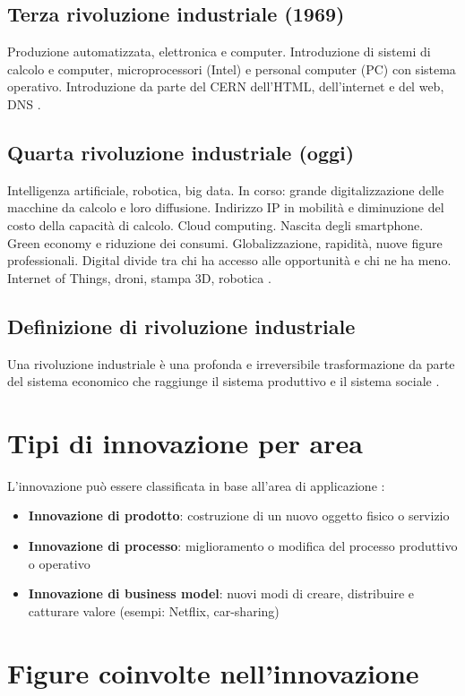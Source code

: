 \documentclass[12pt,a4paper]{article}
\begin{document}
\subsection{Terza rivoluzione industriale (1969)}
Produzione automatizzata, elettronica e computer. Introduzione di sistemi di calcolo e computer, microprocessori (Intel) e personal computer (PC) con sistema operativo. Introduzione da parte del CERN dell'HTML, dell'internet e del web, DNS .

\subsection{Quarta rivoluzione industriale (oggi)}
Intelligenza artificiale, robotica, big data. In corso: grande digitalizzazione delle macchine da calcolo e loro diffusione. Indirizzo IP in mobilità e diminuzione del costo della capacità di calcolo. Cloud computing. Nascita degli smartphone. Green economy e riduzione dei consumi. Globalizzazione, rapidità, nuove figure professionali. Digital divide tra chi ha accesso alle opportunità e chi ne ha meno. Internet of Things, droni, stampa 3D, robotica .

\subsection{Definizione di rivoluzione industriale}
Una rivoluzione industriale è una profonda e irreversibile trasformazione da parte del sistema economico che raggiunge il sistema produttivo e il sistema sociale .

\section{Tipi di innovazione per area}

L'innovazione può essere classificata in base all'area di applicazione :

\begin{itemize}
    \item \textbf{Innovazione di prodotto}: costruzione di un nuovo oggetto fisico o servizio
    \item \textbf{Innovazione di processo}: miglioramento o modifica del processo produttivo o operativo
    \item \textbf{Innovazione di business model}: nuovi modi di creare, distribuire e catturare valore (esempi: Netflix, car-sharing)
\end{itemize}

\section{Figure coinvolte nell'innovazione}
\end{document}
